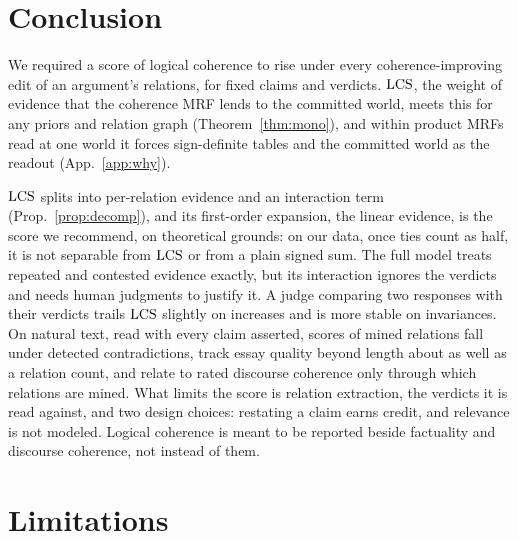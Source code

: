 \section{Conclusion}
\label{sec:discussion}

We required a score of logical coherence to rise under every coherence-improving edit of an
argument's relations, for fixed claims and verdicts. $\mathrm{LCS}$, the weight of evidence that the coherence
MRF lends to the committed world, meets this for any priors and relation graph (Theorem~\ref{thm:mono}),
and within product MRFs read at one world it forces sign-definite tables and the committed world as
the readout (App.~\ref{app:why}).

$\mathrm{LCS}$ splits into per-relation evidence and an interaction term (Prop.~\ref{prop:decomp}), and its
first-order expansion, the linear evidence, is the score we recommend, on theoretical grounds: on our
data, once ties count as half, it is not separable from $\mathrm{LCS}$ or from a plain signed sum. The full model treats repeated and contested evidence exactly, but its interaction ignores the
verdicts and needs human judgments to justify it.
A judge comparing two responses with their verdicts trails $\mathrm{LCS}$ slightly on increases and is more stable
on invariances. On natural text, read with every claim asserted, scores of mined relations fall under detected
contradictions, track essay quality beyond length about as well as a relation count, and relate to
rated discourse coherence only through which relations are mined. What limits the score is relation extraction, the verdicts it is read against, and two design
choices: restating a claim earns credit, and relevance is not modeled. Logical coherence is meant
to be reported beside factuality and discourse coherence, not instead of them.

\section*{Limitations}\label{sec:limitations}

